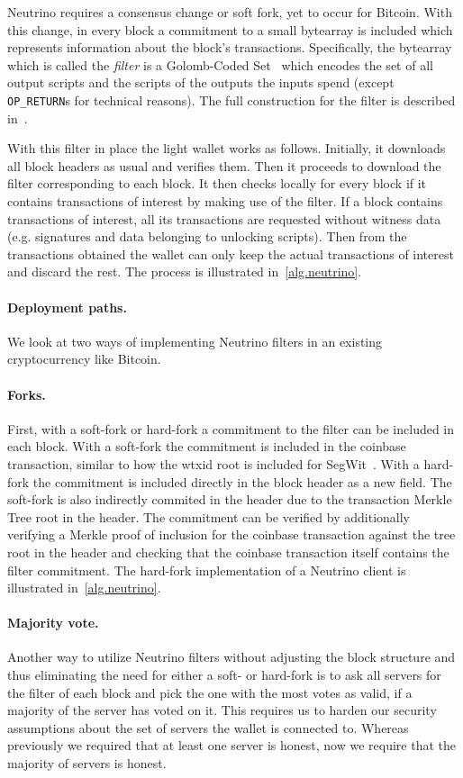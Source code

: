 Neutrino requires a consensus change or soft fork, yet to occur for Bitcoin. With this change, in every block a commitment to a small bytearray is included which represents information about the block's transactions. Specifically, the bytearray which is called the \emph{filter} is a Golomb-Coded Set~\cite{golomb1966run}
which encodes the set of all output scripts and the scripts of the outputs the inputs spend (except \texttt{OP\_RETURN}s for technical reasons). The full construction for the filter is described in~\cite{bip158}.

With this filter in place the light wallet works as follows. Initially, it downloads all block headers as usual and verifies them. Then it proceeds to download the filter corresponding to each block. It then checks locally for every block if it contains transactions of interest by making use of the filter. If a block contains transactions of interest, all its transactions are requested without witness data (e.g. signatures and data belonging to unlocking scripts). Then from the transactions obtained the wallet can only keep the actual transactions of interest and discard the rest. The process is illustrated in~\cref{alg.neutrino}.

\paragraph{Deployment paths.}
We look at two ways of implementing Neutrino filters in an existing cryptocurrency like Bitcoin.

\paragraph{Forks.}
First, with a soft-fork or hard-fork a commitment to the filter can be included in each block. With a soft-fork the commitment is included in the coinbase transaction, similar to how the wtxid root is included for SegWit~\cite{segwit}. With a hard-fork the commitment is included directly in the block header as a new field. The soft-fork is also indirectly commited in the header due to the transaction Merkle Tree root in the header. The commitment can be verified by additionally verifying a Merkle proof of inclusion for the coinbase transaction against the tree root in the header and checking that the coinbase transaction itself contains the filter commitment. The hard-fork implementation of a Neutrino client is illustrated in~\cref{alg.neutrino}.

\paragraph{Majority vote.}
Another way to utilize Neutrino filters without adjusting the block structure and thus eliminating the need for either a soft- or hard-fork is to ask all servers for the filter of each block and pick the one with the most votes as valid, if a majority of the server has voted on it. This requires us to harden our security assumptions about the set of servers the wallet is connected to. Whereas previously we required that at least one server is honest, now we require that the majority of servers is honest.

